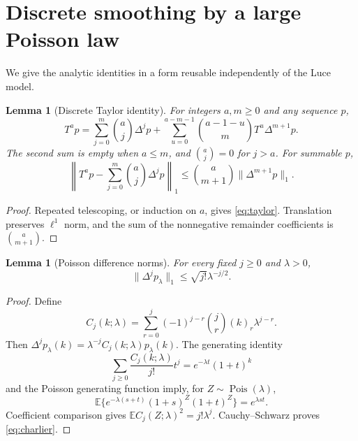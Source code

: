\documentclass[11pt]{article}
\newcommand{\E}{\mathbb E}
\newcommand{\Pois}{\operatorname{Pois}}
\newtheorem{lemma}[theorem]{Lemma}
\theoremstyle{remark}
\begin{document}
\section{Discrete smoothing by a large Poisson law}\label{sec:smoothing}
We give the analytic identities in a form reusable independently of the Luce model.
\begin{lemma}[Discrete Taylor identity]\label{lem:taylor}
For integers $a,m\ge0$ and any sequence $p$,
\begin{equation}\label{eq:taylor}
 T^ap=\sum_{j=0}^m\binom aj\Delta^jp
 +\sum_{u=0}^{a-m-1}\binom{a-1-u}{m}T^u\Delta^{m+1}p.
\end{equation}
The second sum is empty when $a\le m$, and $\binom aj=0$ for $j>a$. For summable $p$,
\begin{equation}\label{eq:taylor-bound}
 \left\|T^ap-\sum_{j=0}^m\binom aj\Delta^jp\right\|_1
 \le\binom a{m+1}\|\Delta^{m+1}p\|_1.
\end{equation}
\end{lemma}
\begin{proof}
Repeated telescoping, or induction on $a$, gives \eqref{eq:taylor}. Translation preserves $\ell^1$ norm, and the sum of the nonnegative remainder coefficients is $\binom a{m+1}$.
\end{proof}

\begin{lemma}[Poisson difference norms]\label{lem:charlier}
For every fixed $j\ge0$ and $\lambda>0$,
\begin{equation}\label{eq:charlier}
 \|\Delta^jp_\lambda\|_1\le\sqrt{j!}\lambda^{-j/2}.
\end{equation}
\end{lemma}
\begin{proof}
Define
\[
 C_j(k;\lambda)=\sum_{r=0}^j(-1)^{j-r}\binom jr(k)_r\lambda^{j-r}.
\]
Then $\Delta^jp_\lambda(k)=\lambda^{-j}C_j(k;\lambda)p_\lambda(k)$. The generating identity
\[
 \sum_{j\ge0}\frac{C_j(k;\lambda)}{j!}t^j=e^{-\lambda t}(1+t)^k
\]
and the Poisson generating function imply, for $Z\sim\Pois(\lambda)$,
\[
 \E\{e^{-\lambda(s+t)}(1+s)^Z(1+t)^Z\}=e^{\lambda st}.
\]
Coefficient comparison gives $\E C_j(Z;\lambda)^2=j!\lambda^j$. Cauchy--Schwarz proves \eqref{eq:charlier}.
\end{proof}
\end{document}
